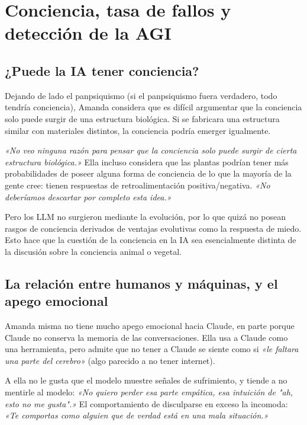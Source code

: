 \section{Conciencia, tasa de fallos y detección de la AGI}

\subsection{¿Puede la IA tener conciencia?}

Dejando de lado el panpsiquismo (si el panpsiquismo fuera verdadero, todo tendría conciencia), Amanda considera que es difícil argumentar que la conciencia solo puede surgir de una estructura biológica. Si se fabricara una estructura similar con materiales distintos, la conciencia podría emerger igualmente.

\textit{«No veo ninguna razón para pensar que la conciencia solo puede surgir de cierta estructura biológica.»} Ella incluso considera que las plantas podrían tener más probabilidades de poseer alguna forma de conciencia de lo que la mayoría de la gente cree: tienen respuestas de retroalimentación positiva/negativa. \textit{«No deberíamos descartar por completo esta idea.»}

Pero los LLM no surgieron mediante la evolución, por lo que quizá no posean rasgos de conciencia derivados de ventajas evolutivas como la respuesta de miedo. Esto hace que la cuestión de la conciencia en la IA sea esencialmente distinta de la discusión sobre la conciencia animal o vegetal.

\subsection{La relación entre humanos y máquinas, y el apego emocional}

Amanda misma no tiene mucho apego emocional hacia Claude, en parte porque Claude no conserva la memoria de las conversaciones. Ella usa a Claude como una herramienta, pero admite que no tener a Claude se siente como si \textit{«le faltara una parte del cerebro»} (algo parecido a no tener internet).

A ella no le gusta que el modelo muestre señales de sufrimiento, y tiende a no mentirle al modelo: \textit{«No quiero perder esa parte empática, esa intuición de "ah, esto no me gusta".»} El comportamiento de disculparse en exceso la incomoda: \textit{«Te comportas como alguien que de verdad está en una mala situación.»}

